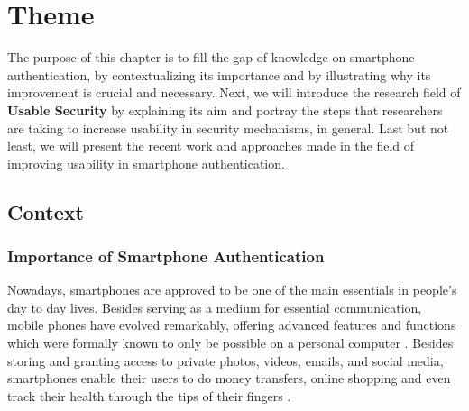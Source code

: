 
\chapter{Theme}\label{ch:second}

The purpose of this chapter is to fill the gap of knowledge on smartphone authentication, by contextualizing its importance and by illustrating why its improvement is crucial and necessary. Next, we will introduce the research field of \textbf{Usable Security} by explaining its aim and portray the steps that researchers are taking to increase usability in security mechanisms, in general. Last but not least, we will present the recent work and approaches made in the field of improving usability in smartphone authentication.   

\section{Context}

\subsection{Importance of Smartphone Authentication}

Nowadays, smartphones are approved to be one of the main essentials in people's day to day lives. Besides serving as a medium for essential communication, mobile phones have evolved remarkably, offering advanced features and functions which were formally known to only be possible on a personal computer \cite{Alsaleh}. Besides storing and granting access to private photos, videos, emails, and social media, smartphones enable their users to do money transfers, online shopping and even track their health through the tips of their fingers \cite{Egelman:2014:YRL:2660267.2660273,Albayram:2017:BUL:3235924.3235929,Schloeglhofer}. \\

